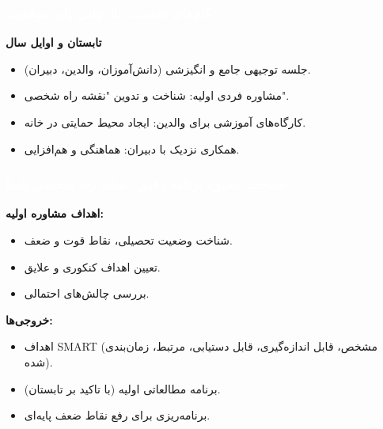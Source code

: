 \documentclass[aspectratio=169]{beamer}
\begin{document}
\begin{frame}
  \frametitle{\textcolor{white}{\textbf{گام‌های نخست: بنا نهادن پایه موفقیت}}}
  \textbf{تابستان و اوایل سال}
  \begin{itemize}
    \item جلسه توجیهی جامع و انگیزشی (دانش‌آموزان، والدین، دبیران).
    \item مشاوره فردی اولیه: شناخت و تدوین "نقشه راه شخصی".
    \item کارگاه‌های آموزشی برای والدین: ایجاد محیط حمایتی در خانه.
    \item همکاری نزدیک با دبیران: هماهنگی و هم‌افزایی.
  \end{itemize}
\end{frame}

\begin{frame}
  \frametitle{\textcolor{white}{\textbf{شناخت عمیق، برنامه دقیق: نقشه راه شخصی شما}}}
  \textbf{اهداف مشاوره اولیه:}
  \begin{itemize}
    \item شناخت وضعیت تحصیلی، نقاط قوت و ضعف.
    \item تعیین اهداف کنکوری و علایق.
    \item بررسی چالش‌های احتمالی.
  \end{itemize}
  \medskip
  \textbf{خروجی‌ها:}
  \begin{itemize}
    \item اهداف SMART (مشخص، قابل اندازه‌گیری، قابل دستیابی، مرتبط، زمان‌بندی شده).
    \item برنامه مطالعاتی اولیه (با تاکید بر تابستان).
    \item برنامه‌ریزی برای رفع نقاط ضعف پایه‌ای.
  \end{itemize}
\end{frame}
\end{document}
